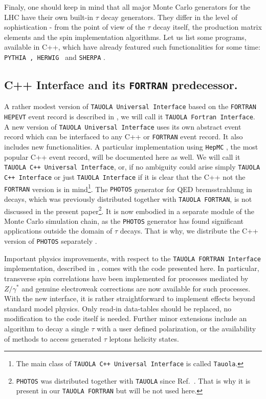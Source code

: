\documentclass[]{Tauola_interface_design}
\begin{document}
Finaly, one should keep in mind 
that all major  Monte Carlo generators for the LHC have their own 
built-in $\tau$ decay generators. They differ in the level of sophistication -
from the point of view of  
the $\tau$ decay itself, the production matrix elements and the spin implementation 
algorithms. Let us list some programs, available in C++, which have already featured such 
functionalities for some time:
{\tt PYTHIA \cite{Sjostrand:2007gs}, 
HERWIG \cite{Bahr:2008pv,Grellscheid:2007tt}}
and {\tt SHERPA} \cite{Gleisberg:2008ta}.


\subsection{C++ Interface and its {\tt FORTRAN} predecessor.}

A rather modest version of {\tt TAUOLA Universal Interface} based on 
the {\tt FORTRAN HEPEVT}
event record 
is described in \cite{Golonka:2003xt}, we will call it 
{\tt TAUOLA Fortran Interface}. A new version of {\tt TAUOLA Universal Interface}
uses its own abstract event record which can be interfaced to any 
C++ or {\tt FORTRAN} event record. It also includes new functionalities. 
A particular implementation using
  {\tt HepMC} \cite{Dobbs:2001ck}, the most popular C++ event record,
 will be documented here as well.
We will call it {\tt TAUOLA C++ Universal Interface}, or, if no ambiguity 
could arise simply  {\tt TAUOLA C++ Interface} or  just
{\tt TAUOLA   Interface} if it is clear that the C++ not the
 {\tt FORTRAN} version is in mind\footnote{The main class of 
{\tt TAUOLA C++ Universal Interface} is called {\tt Tauola}.}.
The {\tt PHOTOS}  generator for
QED bremsstrahlung in decays, which was previously distributed together with {\tt TAUOLA FORTRAN}, is not discussed in the present 
paper\footnote{{\tt PHOTOS} was distributed together with 
{\tt TAUOLA} since Ref.~\cite{Golonka:2003xt}. That is why it is present in our 
{\tt TAUOLA FORTRAN} but will be not used here.  }. It is now embodied  in a separate module
\cite{Barberio:1990ms,Barberio:1994qi} of the Monte Carlo simulation chain,
as the {\tt PHOTOS} generator has  found significant applications outside the domain of $\tau$ decays. 
That is why, we distribute the C++ version of {\tt PHOTOS} 
separately \cite{photosC++,Davidson:2010ew}.


Important physics improvements, with respect to the {\tt TAUOLA FORTRAN Interface} implementation,
described in \cite{Golonka:2003xt}, comes with the code presented here. In
particular, transverse spin correlations have been implemented for
processes mediated by $Z/\gamma^*$ and genuine electroweak corrections
are now available for such processes.
With the new interface, it is rather straightforward to implement effects  beyond 
standard
model physics. Only  read-in data-tables should be replaced,
 no modification
to the code itself is needed. Further minor extensions 
include an algorithm to 
decay a single  $\tau$ with a user defined polarization, or the availability of  methods to
access generated $\tau$ leptons helicity states.
\end{document}
